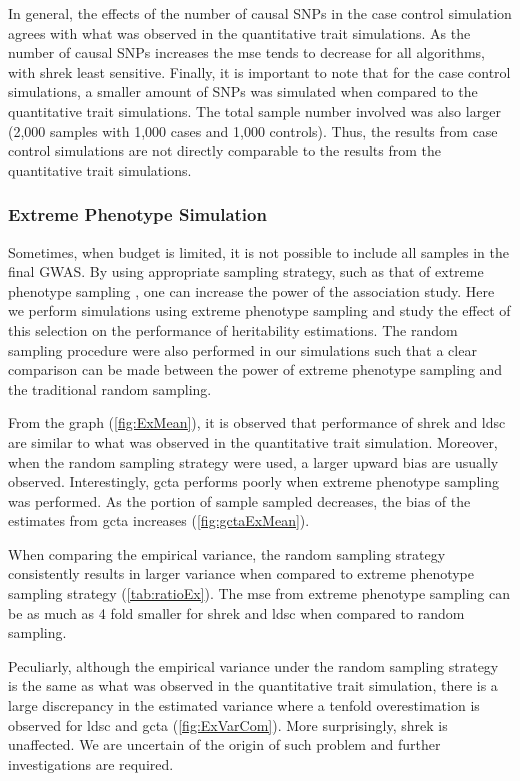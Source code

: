 		In general, the effects of the number of causal \glspl{SNP} in the case control simulation agrees with what was observed in the quantitative trait simulations.
		As the number of causal \glspl{SNP} increases the \gls{mse} tends to decrease for all algorithms, with \gls{shrek} least sensitive.
		Finally, it is important to note that for the case control simulations, a smaller amount of \glspl{SNP} was simulated when compared to the quantitative trait simulations. 
		The total sample number involved was also larger (2,000 samples with 1,000 cases and 1,000 controls).
		Thus, the results from case control simulations are not directly comparable to the results from the quantitative trait simulations.
		
		\subsubsection{Extreme Phenotype Simulation}
		
		Sometimes, when budget is limited, it is not possible to include all samples in the final \gls{GWAS}. 
		By using appropriate sampling strategy, such as that of extreme phenotype sampling \citep{Peloso2015}, one can increase the power of the association study.
		Here we perform simulations using extreme phenotype sampling and study the effect of this selection on the performance of heritability estimations.
		The random sampling procedure were also performed in our simulations such that a clear comparison can be made between the power of extreme phenotype sampling and the traditional random sampling.
		
		From the graph (\cref{fig:ExMean}), it is observed that performance of \gls{shrek} and \gls{ldsc} are similar to what was observed in the quantitative trait simulation.
		Moreover, when the random sampling strategy were used, a larger upward bias are usually observed. 
		Interestingly, \gls{gcta} performs poorly when extreme phenotype sampling was performed.
		As the portion of sample sampled decreases, the bias of the estimates from \gls{gcta} increases (\cref{fig:gctaExMean}).
		
		When comparing the empirical variance, the random sampling strategy consistently results in larger variance when compared to extreme phenotype sampling strategy (\cref{tab:ratioEx}).
		The \gls{mse} from extreme phenotype sampling can be as much as 4 fold smaller for \gls{shrek} and \gls{ldsc} when compared to random sampling.
		
		Peculiarly, although the empirical variance under the random sampling strategy is the same as what was observed in the quantitative trait simulation, there is a large discrepancy in the estimated variance where a tenfold overestimation is observed for \gls{ldsc} and \gls{gcta} (\cref{fig:ExVarCom}). 
		More surprisingly, \gls{shrek} is unaffected. 
		We are uncertain of the origin of such problem and further investigations are required.
		
